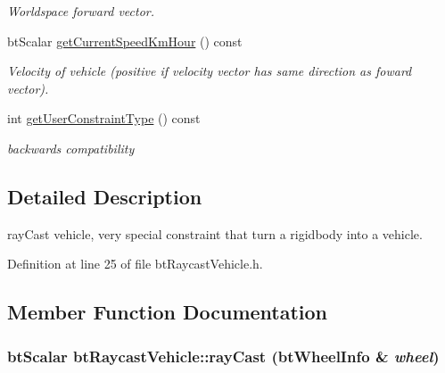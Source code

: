 \begin{CompactItemize}
\begin{CompactList}\small\item\em Worldspace forward vector. \item\end{CompactList}\item 
\hypertarget{classbt_raycast_vehicle_8db5fe1a6b3b36f144cc7a14f59e1c1e}{
btScalar \hyperlink{classbt_raycast_vehicle_8db5fe1a6b3b36f144cc7a14f59e1c1e}{getCurrentSpeedKmHour} () const }
\label{classbt_raycast_vehicle_8db5fe1a6b3b36f144cc7a14f59e1c1e}

\begin{CompactList}\small\item\em Velocity of vehicle (positive if velocity vector has same direction as foward vector). \item\end{CompactList}\item 
\hypertarget{classbt_raycast_vehicle_6e6ae8ff0a356616fc73f5a558d9b1c1}{
int \hyperlink{classbt_raycast_vehicle_6e6ae8ff0a356616fc73f5a558d9b1c1}{getUserConstraintType} () const }
\label{classbt_raycast_vehicle_6e6ae8ff0a356616fc73f5a558d9b1c1}

\begin{CompactList}\small\item\em backwards compatibility \item\end{CompactList}\end{CompactItemize}


\subsection{Detailed Description}
rayCast vehicle, very special constraint that turn a rigidbody into a vehicle. 

Definition at line 25 of file btRaycastVehicle.h.

\subsection{Member Function Documentation}
\hypertarget{classbt_raycast_vehicle_53451c4e3495561f3f078b2041ef04be}{
\subsubsection[rayCast]{\setlength{\rightskip}{0pt plus 5cm}btScalar btRaycastVehicle::rayCast ({\bf btWheelInfo} \& {\em wheel})}}
\label{classbt_raycast_vehicle_53451c4e3495561f3f078b2041ef04be}




